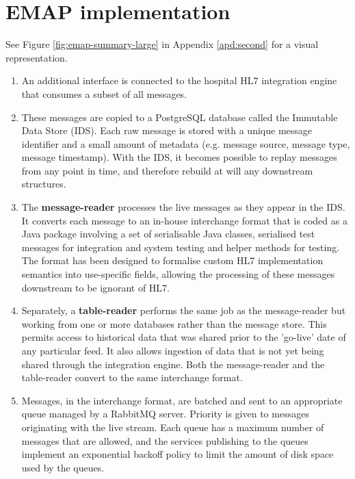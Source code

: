 \documentclass[pmlr,twocolumn,10pt]{jmlr} %
\begin{document}



\appendix

\section{EMAP implementation}\label{apd:first}

See Figure \ref{fig:emap-summary-large} in Appendix \ref{apd:second} for a visual representation.

\begin{enumerate}
    \item An additional interface is connected to the hospital HL7 integration engine that consumes a subset of all messages.
    \item These messages are copied to a PostgreSQL database called the Immutable Data Store (IDS). Each raw message is stored with a unique message identifier and a small amount of metadata (e.g. message source, message type, message timestamp). With the IDS, it becomes possible to replay messages from any point in time, and therefore rebuild at will any downstream structures.
    \item The \textbf{message-reader} processes the live messages as they appear in the IDS. It converts each message to an in-house interchange format that is coded as a Java package involving a set of serialisable Java classes, serialised test messages for integration and system testing and helper methods for testing. The format has been designed to formalise custom HL7 implementation semantics into use-specific fields, allowing the processing of these messages downstream to be ignorant of HL7. 
    \item Separately, a \textbf{table-reader} performs the same job as the message-reader but working from one or more databases rather than the message store. This permits access to historical data that was shared prior to the 'go-live' date of any particular feed. It also allows ingestion of data that is not yet being shared through the integration engine. Both the message-reader and the table-reader convert to the same interchange format.
    \item Messages, in the interchange format, are batched and sent to an appropriate queue managed by a RabbitMQ server. Priority is given to messages originating with the live stream. Each queue has a maximum number of messages that are allowed, and the services publishing to the queues implement an exponential backoff policy to limit the amount of disk space used by the queues.

\end{enumerate}
\end{document}
